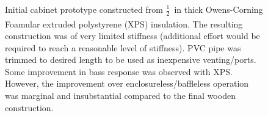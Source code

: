 \begin{figure}[h!]
\centering
{}
\qquad
{}
\caption{Initial cabinet prototype constructed from $\frac{1}{2}$~in thick Owens-Corning Foamular\textsuperscript{\textregistered} extruded polystyrene (XPS) insulation. The resulting construction was of very limited stiffness (additional effort would be required to reach a reasonable level of stiffness). PVC pipe was trimmed to desired length to be used as inexpensive venting/ports. Some improvement in bass response was observed with XPS. However, the improvement over enclosureless/baffleless operation was marginal and insubstantial compared to the final wooden construction.}
\label{fig:sp_xps_proto}
\end{figure}
